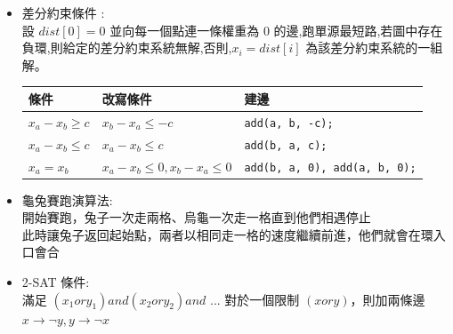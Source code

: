 \begin{itemize}
\item 差分約束條件 :\\
  設 $dist[0] = 0$ 並向每一個點連一條權重為 $0$ 的邊,跑單源最短路,若圖中存在負環,則給定的差分約束系統無解,否則,$x_i = dist[i]$ 為該差分約束系統的一組解。
  \newline
  
  \begin{tabular}{|p{}|p{}|p{}|}
  \hline
  條件 & 改寫條件 & 建邊 \\
  \hline
  $x_a - x_b \geq c$ & $x_b - x_a \leq -c$ & \texttt{add(a, b, -c);} \\
  \hline
  $x_a - x_b \leq c$ & $x_a - x_b \leq c$ & \texttt{add(b, a, c);} \\
  \hline
  $x_a = x_b$ & $x_a - x_b \leq 0, x_b - x_a \leq 0$ & \texttt{add(b, a, 0), add(a, b, 0);} \\
  \hline
  \end{tabular}
\item 龜兔賽跑演算法: \\
  開始賽跑，兔子一次走兩格、烏龜一次走一格直到他們相遇停止\\
  此時讓兔子返回起始點，兩者以相同走一格的速度繼續前進，他們就會在環入口會合
\item 2-SAT 條件: \\
滿足 $(x_{1}  or  y_{1}) and (x_{2}  or  y_{2}) and $ ...
對於一個限制 $(x  or  y)$，則加兩條邊 $x  →  ¬y, y  →  ¬x$
\end{itemize}


